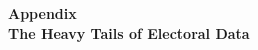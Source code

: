 \documentclass[12pt]{article}
\begin{document}
\singlespace

%



\newpage
\doublespace
\begin{appendix}
\begin{center}
\textbf{{\LARGE Appendix}}\\\vspace{2mm}
\textbf{{\large The Heavy Tails of Electoral Data}}\\\vspace{2mm}

\end{center}
\section{}


\end{appendix}
\end{document}

